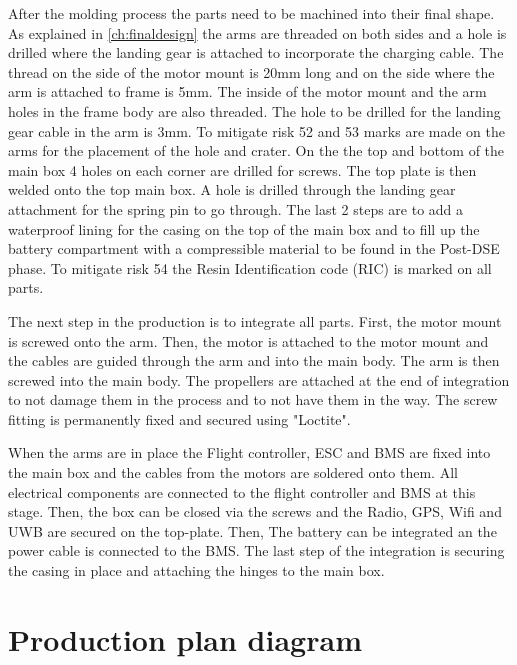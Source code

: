 After the molding process the parts need to be machined into their final shape. As explained in \autoref{ch:finaldesign} the arms are threaded on both sides and a hole is drilled where the landing gear is attached to incorporate the charging cable. The thread on the side of the motor mount is 20mm long and on the side where the arm is attached to frame is 5mm. The inside of the motor mount and the arm holes in the frame body are also threaded. The hole to be drilled for the landing gear cable in the arm is 3mm. To mitigate risk 52 and 53 marks are made on the arms for the placement of the hole and crater. On the the top and bottom of the main box 4 holes on each corner are drilled for screws. The top plate is then welded onto the top main box. A hole is drilled through the landing gear attachment for the spring pin to go through. The last 2 steps are to add a waterproof lining for the casing on the top of the main box and to fill up the battery compartment with a compressible material to be found in the Post-DSE phase. To mitigate risk 54 the Resin Identification code (RIC) is marked on all parts.

The next step in the production is to integrate all parts.
First, the motor mount is screwed onto the arm. Then, the motor is attached to the motor mount and the cables are guided through the arm and into the main body. The arm is then screwed into the main body. The propellers are attached at the end of integration to not damage them in the process and to not have them in the way. The screw fitting is permanently fixed and secured using  "Loctite". 

When the arms are in place the Flight controller, ESC and BMS are fixed into the main box and the cables from the motors are soldered onto them. All electrical components are connected to the flight controller and BMS at this stage. Then, the box can be closed via the screws and the Radio, GPS, Wifi and UWB are secured on the top-plate. Then, The battery can be integrated an the power cable is connected to the BMS. The last step of the integration is securing the casing in place and attaching the hinges to the main box.

\section{Production plan diagram}\label{sec:ppdiagram}




